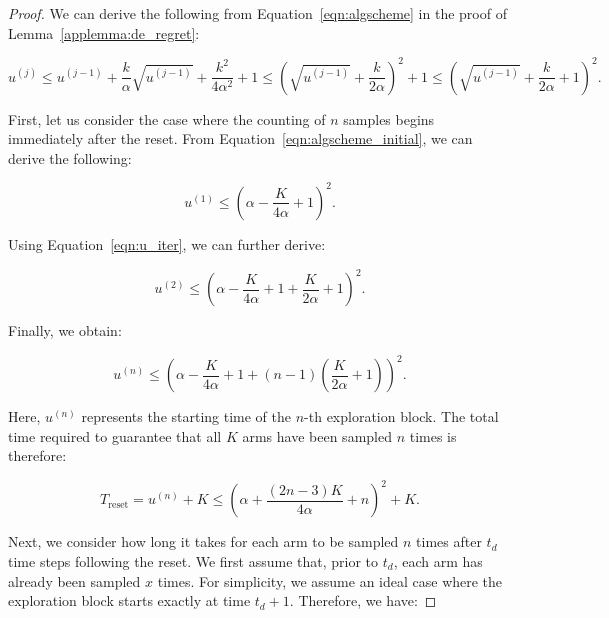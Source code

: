 \documentclass[10pt,a4paper]{amsart}
\begin{document}
\begin{proof}

    We can derive the following from Equation~\ref{eqn:algscheme} in the proof of Lemma~\ref{applemma:de_regret}:
    
    \begin{equation}\label{eqn:u_iter}
    u^{(j)} \leq u^{(j-1)} + \frac{k}{\alpha} \sqrt{u^{(j-1)}} + \frac{k^2}{4\alpha^2} + 1 
    \leq \left( \sqrt{u^{(j-1)}} + \frac{k}{2\alpha} \right)^2 + 1 
    \leq \left( \sqrt{u^{(j-1)}} + \frac{k}{2\alpha} + 1 \right)^2.
    \end{equation}
    
    First, let us consider the case where the counting of \(n\) samples begins immediately after the reset. From Equation~\ref{eqn:algscheme_initial}, we can derive the following:
    
    \begin{equation}
    u^{(1)} \leq \left( \alpha - \frac{K}{4\alpha} + 1 \right)^2.
    \end{equation}
    
    Using Equation~\ref{eqn:u_iter}, we can further derive:
    
    \begin{equation}
    u^{(2)} \leq \left( \alpha - \frac{K}{4\alpha} + 1 + \frac{K}{2\alpha} + 1 \right)^2.
    \end{equation}
    
    Finally, we obtain:
    
    \begin{equation}
    u^{(n)} \leq \left( \alpha - \frac{K}{4\alpha} + 1 + (n-1)\left( \frac{K}{2\alpha} + 1 \right) \right)^2.
    \end{equation}
    
    Here, \(u^{(n)}\) represents the starting time of the \(n\)-th exploration block. The total time required to guarantee that all \(K\) arms have been sampled \(n\) times is therefore:
    
    \begin{equation}
    T_{\text{reset}} = u^{(n)} + K \leq \left( \alpha + \frac{(2n-3)K}{4\alpha} + n \right)^2 + K.
    \end{equation}
    
    Next, we consider how long it takes for each arm to be sampled \(n\) times after \(t_d\) time steps following the reset. We first assume that, prior to \(t_d\), each arm has already been sampled \(x\) times. For simplicity, we assume an ideal case where the exploration block starts exactly at time \(t_d + 1\). Therefore, we have:
    

\end{proof}
\end{document}
